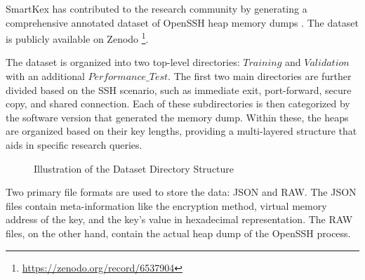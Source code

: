     SmartKex has contributed to the research community by generating a comprehensive annotated dataset of OpenSSH heap memory dumps \cite{SmartKex22}. The dataset is publicly available on Zenodo \footnote{\url{https://zenodo.org/record/6537904}}. 

    \begin{minipage}{\dimexpr\linewidth-20pt}
        The dataset is organized into two top-level directories: $Training$ and $Validation$ with an additional $Performance\_Test$. The first two main directories are further divided based on the SSH scenario, such as immediate exit, port-forward, secure copy, and shared connection. Each of these subdirectories is then categorized by the software version that generated the memory dump. Within these, the heaps are organized based on their key lengths, providing a multi-layered structure that aids in specific research queries.

        \begin{figure}[H]
            \centering
            \caption{Illustration of the Dataset Directory Structure}
            \label{fig:dataset_structure}
            \begin{minipage}{0.6\textwidth}
        \end{minipage}
        \end{figure}
    \end{minipage}

    Two primary file formats are used to store the data: JSON and RAW. The JSON files contain meta-information like the encryption method, virtual memory address of the key, and the key's value in hexadecimal representation. The RAW files, on the other hand, contain the actual heap dump of the OpenSSH process.

